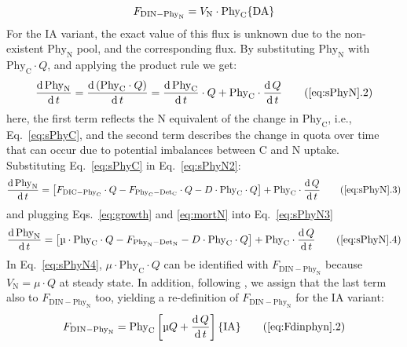 \documentclass[gmd, manuscript]{copernicus}
\begin{document}
\begin{equation}
  \label{eq:Fdinphyn}
  F_{\text{DIN}-\text{Phy}_{\text{N}}} = V_{\text{N}} \cdot \text{Phy}_{\text{C}} \hfill \{\text{DA}\}
\end{equation}
For the IA variant, the exact value of this flux is unknown due to the non-existent $\text{Phy}_{\text{N}}$ pool, and the corresponding flux. By substituting $\text{Phy}_{\text{N}}$ with  $\text{Phy}_{\text{C}}\cdot Q$, and applying the product rule we get:
\begin{equation}
  \label{eq:sPhyN2}
  \frac{\mathrm{d}\,\text{Phy}_{\text{N}}}{\mathrm{d}\,t} = \frac{\mathrm{d}\,(\text{Phy}_{\text{C}}\cdot Q)}{\mathrm{d}\,t}
  = \frac{\mathrm{d}\,\text{Phy}_{\text{C}}}{\mathrm{d}\,t} \cdot Q + \text{Phy}_{\text{C}} \cdot \frac{\mathrm{d}\,Q}{\mathrm{d}\,t} \tag{\ref{eq:sPhyN}.2}
\end{equation}
here, the first term reflects the N equivalent of the change in $\text{Phy}_{\text{C}}$, i.e., Eq.~\ref{eq:sPhyC}, and the second term describes the change in quota over time that can occur due to potential imbalances between C and N uptake. Substituting Eq.~\ref{eq:sPhyC} in Eq.~\ref{eq:sPhyN2}:
\begin{equation}
  \label{eq:sPhyN3}
  \frac{\mathrm{d}\,\text{Phy}_{\text{N}}}{\mathrm{d}\,t} = \left[ F_{\text{DIC}-\text{Phy}_{\text{C}}} \cdot Q - F_{\text{Phy}_{\text{C}}-\text{Det}_{\text{C}}} \cdot Q - D \cdot \text{Phy}_{\text{C}} \cdot Q \right] + \text{Phy}_{\text{C}} \cdot \frac{\mathrm{d}\,Q}{\mathrm{d}\,t}
 \tag{\ref{eq:sPhyN}.3}
\end{equation}
and plugging Eqs.~\ref{eq:growth} and \ref{eq:mortN} into Eq.~\ref{eq:sPhyN3}
\begin{equation}
  \label{eq:sPhyN4}
  \frac{\mathrm{d}\,\text{Phy}_{\text{N}}}{\mathrm{d}\,t} = \left[ \mu \cdot \text{Phy}_{\text{C}} \cdot Q - F_{\text{Phy}_{\text{N}}-\text{Det}_{\text{N}}} - D \cdot \text{Phy}_{\text{C}} \cdot Q \right] + \text{Phy}_{\text{C}} \cdot \frac{\mathrm{d}\,Q}{\mathrm{d}\,t}
 \tag{\ref{eq:sPhyN}.4}
\end{equation}
In Eq.~\ref{eq:sPhyN4}, $\mu \cdot \text{Phy}_{\text{C}} \cdot Q$ can be identified with $F_{\text{DIN}-\text{Phy}_{\text{N}}}$ because $V_{\text{N}} =  \mu\cdot Q$ at steady state. In addition, following \citet{Smith2016}, we assign that the last term also to $F_{\text{DIN}-\text{Phy}_{\text{N}}}$ too, yielding a re-definition of $F_{\text{DIN}-\text{Phy}_{\text{N}}}$ for the IA variant:
\begin{equation}
  \label{eq:Fdinphyn2}
  F_{\text{DIN}-\text{Phy}_{\text{N}}} = \text{Phy}_{\text{C}} \left[ \mu Q + \frac{\mathrm{d}\,Q}{\mathrm{d}\,t} \right] \hfill \{\text{IA}\}
  \tag{\ref{eq:Fdinphyn}.2}
\end{equation}
\end{document}
